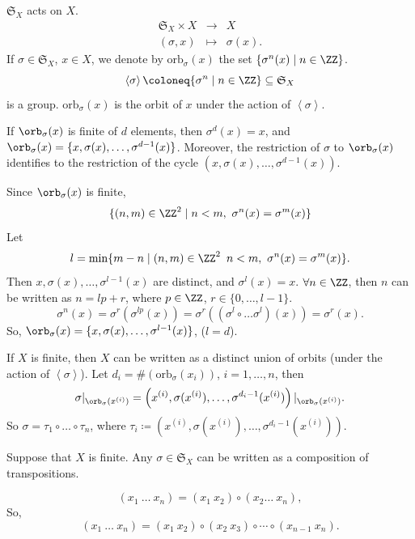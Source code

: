 \begin{remark}
    $\mathfrak{S}_X$ acts on $X$.
    $$\begin{array}{rcl}
        \mathfrak{S}_X\times X&\longrightarrow &X\\
        (\sigma,x)&\longmapsto& \sigma(x).
    \end{array}$$
    If $\sigma\in\mathfrak{S}_X$, $x\in X$, we denote by $\mathrm{orb}_\sigma(x)$ the set $\{\sigma^n(x)\mid n\in \ZZ\}$.
    $$\left \langle \sigma\right \rangle \coloneq \{\sigma^n\mid n\in \ZZ\}\subseteq \mathfrak{S}_X$$
    is a group. $\mathrm{orb}_\sigma(x)$ is the orbit of $x$ under the action of $\left \langle \sigma\right \rangle$.
\end{remark}
\begin{propositionenv}
    If $\orb_\sigma(x)$ is finite of $d$ elements, then $\sigma^d(x)=x$, and $\orb_\sigma (x)=\{x,\sigma(x),\ldots,\sigma^{d-1}(x)\}$. Moreover, the restriction of $\sigma$ to $\orb_\sigma(x)$ identifies to the restriction of the cycle $(x,\sigma(x),\ldots,\sigma^{d-1}(x))$.
\end{propositionenv}
\begin{proofenv}
    Since $\orb_\sigma(x)$ is finite,
    $$\{(n,m)\in \ZZ^2\mid n<m,\ \sigma^n(x)=\sigma^m(x)\}$$
    Let $$l=\min\{m-n\mid (n,m)\in \ZZ^2\,\ n<m,\ \sigma^n(x)=\sigma^m(x)\}.$$
    Then $x,\sigma(x),\ldots,\sigma^{l-1}(x)$ are distinct, and $\sigma^l(x)=x$.
    $\forall n\in \ZZ$, then $n$ can be written as $n=lp+r$, where $p\in \ZZ$, $r\in \{0,\ldots,l-1\}$.
    $$ \sigma^n(x)=\sigma^r(\sigma^{lp}(x))=\sigma^r((\sigma^{l}\circ\dots\sigma^l)(x))=\sigma^r(x).$$
    So, $\orb_\sigma(x)=\{x,\sigma(x),\ldots,\sigma^{l-1}(x)\}$, ($l=d$).
\end{proofenv}
\begin{remark}
    If $X$ is finite, then $X$ can be written as a distinct union of orbits (under the action of $\left\langle \sigma\right\rangle$). Let $d_i=\#(\mathrm{orb}_\sigma(x_i))$, $i=1,\ldots,n$, then
    $$\sigma|_{\orb_\sigma (x^{(i)})}=\left(x^{(i)},\sigma(x^{(i)}),\ldots,\sigma^{d_i-1}(x^{(i)})\right)|_{\orb_\sigma(x^{(i)})}.$$
    So $\sigma=\tau_1\circ\dots\circ\tau_n$, where $\tau_i\coloneq (x^{(i)},\sigma(x^{(i)}),\ldots,\sigma^{d_i-1}(x^{(i)}))$.
\end{remark}
\begin{corollaryenv}
    Suppose that $X$ is finite. Any $\sigma\in \mathfrak{S}_X$ can be written as a composition of transpositions.
\end{corollaryenv}
\begin{proofenv}
    $$(x_1 \ \dots \ x_n)=(x_1\ x_2)\circ (x_2 \dots \ x_n),$$
    So, $$(x_1 \ \dots \ x_n)=(x_1\ x_2)\circ (x_2\ x_3)\circ \cdots \circ (x_{n-1}\ x_n).$$
\end{proofenv}
